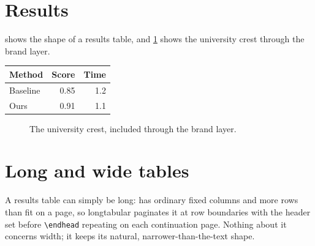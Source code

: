 \section{Results}
 shows the shape of a results table, and \cref{fig:crest} shows the university crest through the brand layer.

\begin{table}[htbp]
  \centering
  \label{tab:sample}
  \begin{tabular}{lrr}
    \hline
    Method & Score & Time \\
    \hline
    Baseline & 0.85 & 1.2 \\
    Ours & 0.91 & 1.1 \\
    \hline
  \end{tabular}
\end{table}

\begin{figure}[htbp]
  \centering
  \bangorcrest[4cm]
  \caption{The university crest, included through the brand layer.}
  \label{fig:crest}
\end{figure}

\section{Long and wide tables}
A results table can simply be long:  has ordinary fixed columns and more rows than fit on a page, so longtabular paginates it at row boundaries with the header set before \texttt{\textbackslash endhead} repeating on each continuation page. Nothing about it concerns width; it keeps its natural, narrower-than-the-text shape.

